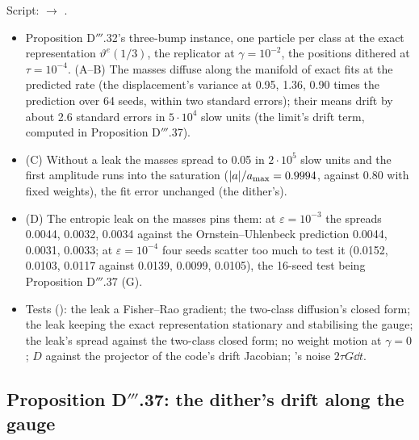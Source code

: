 Script:  $\to$ .
\begin{itemize}
  \item Proposition D$'''$.32's three-bump instance, one particle per class at the exact representation
    $\vartheta^e(1/3)$, the replicator at $\gamma = 10^{-2}$, the positions dithered at $\tau = 10^{-4}$. (A--B) The
    masses diffuse along the manifold of exact fits at the predicted rate (the displacement's variance at 0.95, 1.36,
    0.90 times the prediction over 64 seeds, within two standard errors); their means drift by about 2.6 standard
    errors in $5\cdot10^4$ slow units (the limit's drift term, computed in Proposition D$'''$.37).
  \item (C) Without a leak the masses spread to 0.05 in $2\cdot10^5$ slow units and the first amplitude runs into the
    saturation ($\lvert a\rvert/a_{\max} = 0.9994$, against 0.80 with fixed weights), the fit error unchanged (the dither's).
  \item (D) The entropic leak on the masses pins them: at $\varepsilon = 10^{-3}$ the spreads 0.0044, 0.0032, 0.0034
    against the Ornstein--Uhlenbeck prediction 0.0044, 0.0031, 0.0033; at $\varepsilon = 10^{-4}$ four seeds scatter
    too much to test it (0.0152, 0.0103, 0.0117 against 0.0139, 0.0099, 0.0105), the 16-seed test being
    Proposition D$'''$.37 (G).
  \item Tests (): the leak a Fisher--Rao gradient; the two-class diffusion's closed
    form; the leak keeping the exact representation stationary and stabilising the gauge; the leak's spread against
    the two-class closed form; no weight motion at $\gamma = 0$; $D$ against the projector of the code's drift
    Jacobian; 's noise $2\tau G\dd t$.
\end{itemize}

\subsection{Proposition D\texorpdfstring{$'''$}{'''}.37: the dither's drift along the gauge}

